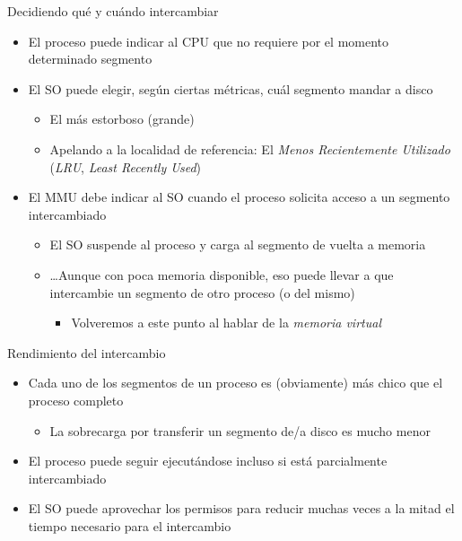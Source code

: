 \documentclass[presentation]{beamer}
\begin{document}
\begin{frame}[label={sec:org1a27e83}]{Decidiendo qué y cuándo intercambiar}
\begin{itemize}
\item El proceso puede indicar al CPU que no requiere por el momento
determinado segmento
\item El SO puede elegir, según ciertas métricas, cuál segmento mandar a
disco
\begin{itemize}
\item El más estorboso (grande)
\item Apelando a la localidad de referencia: El \emph{Menos Recientemente
Utilizado} (\emph{LRU}, \emph{Least Recently Used})
\end{itemize}
\item El MMU debe indicar al SO cuando el proceso solicita acceso a un
segmento intercambiado
\begin{itemize}
\item El SO suspende al proceso y carga al segmento de vuelta a memoria
\item \ldots{}Aunque con poca memoria disponible, eso puede llevar a que
intercambie un segmento de otro proceso (o del mismo)
\begin{itemize}
\item Volveremos a este punto al hablar de la \emph{memoria virtual}
\end{itemize}
\end{itemize}
\end{itemize}
\end{frame}

\begin{frame}[label={sec:org44a27ca}]{Rendimiento del intercambio}
\begin{itemize}
\item Cada uno de los segmentos de un proceso es (obviamente) más chico
que el proceso completo
\begin{itemize}
\item La sobrecarga por transferir un segmento de/a disco es mucho menor
\end{itemize}
\item El proceso puede seguir ejecutándose incluso si está parcialmente
intercambiado
\item El SO puede aprovechar los permisos para reducir muchas veces a la
mitad el tiempo necesario para el intercambio
\end{itemize}
\end{frame}
\end{document}
